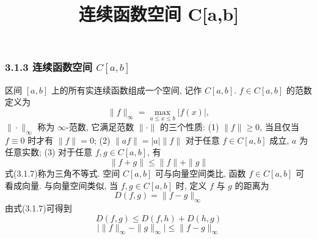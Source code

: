 \documentclass[
  10pt,
  fontset=fandol]{ctexart}
\title{连续函数空间 C{[}a,b{]}}
\author{}
\date{}
\begin{document}
\maketitle

\subsubsection{\texorpdfstring{3.1.3 连续函数空间 \(C[a,b]\)}{3.1.3 连续函数空间 C{[}a,b{]}}}\label{ux8fdeux7eedux51fdux6570ux7a7aux95f4-cab}

区间 \([a,b]\) 上的所有实连续函数组成一个空间, 记作 \(C[a,b]\). \(f \in C[a,b]\) 的范数定义为 \[
\|f\|_\infty = \max_{a \leqslant x \leqslant b} |f(x)| ,
\] \(\|\cdot\|_\infty\) 称为 \(\infty\)-范数, 它满足范数 \(\|\cdot\|\) 的三个性质: (1) \(\|f\| \geqslant 0\), 当且仅当 \(f \equiv 0\) 时才有 \(\|f\| = 0\); (2) \(\|af\| = |a| \|f\|\) 对于任意 \(f \in C[a,b]\) 成立, \(a\) 为任意实数; (3) 对于任意 \(f,g \in C[a,b]\), 有 \[
\|f+g\| \leqslant \|f\| + \|g\| \tag{3.1.7}
\] 式(3.1.7)称为三角不等式. 空间 \(C[a,b]\) 可与向量空间类比, 函数 \(f \in C[a,b]\) 可看成向量. 与向量空间类似, 当 \(f,g \in C[a,b]\) 时, 定义 \(f\) 与 \(g\) 的距离为 \[
D(f,g) = \|f-g\|_\infty \tag{3.1.8}
\] 由式(3.1.7)可得到 \[
D(f,g) \leqslant D(f,h) + D(h,g) \tag{3.1.9}
\] \[
\bigl|\|f\|_\infty - \|g\|_\infty\bigr| \leqslant \|f-g\|_\infty \tag{3.1.10}
\]
\end{document}
